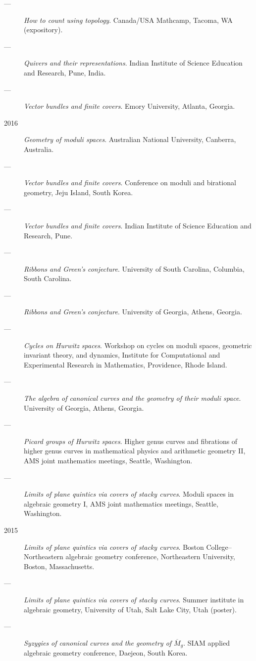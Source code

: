\documentclass[11pt]{article}
\begin{document}
\begin{description}
\item[{---}] \emph{How to count using topology}. Canada/USA Mathcamp, Tacoma, WA (expository).
\item[{---}] \emph{Quivers and their representations}. Indian Institute of Science Education and Research, Pune, India.
\item[{---}] \emph{Vector bundles and finite covers}. Emory University, Atlanta, Georgia.
\item[{2016}] \emph{Geometry of moduli spaces}. Australian National University, Canberra, Australia.
\item[{---}] \emph{Vector bundles and finite covers}. Conference on moduli and birational geometry, Jeju Island, South Korea.
\item[{---}] \emph{Vector bundles and finite covers}. Indian Institute of Science Education and Research, Pune.
\item[{---}] \emph{Ribbons and Green's conjecture}. University of South Carolina, Columbia, South Carolina.
\item[{---}] \emph{Ribbons and Green's conjecture}. University of Georgia, Athens, Georgia.
\item[{---}] \emph{Cycles on Hurwitz spaces}. Workshop on cycles on moduli spaces, geometric invariant theory, and dynamics, Institute for Computational and Experimental Research in Mathematics, Providence, Rhode Island.
\item[{---}] \emph{The algebra of canonical curves and the geometry of their moduli space}. University of Georgia, Athens, Georgia.
\item[{---}] \emph{Picard groups of Hurwitz spaces}. Higher genus curves and fibrations of higher genus curves in mathematical physics and arithmetic geometry II, AMS joint mathematics meetings, Seattle, Washington.
\item[{---}] \emph{Limits of plane quintics via covers of stacky curves}. Moduli spaces in algebraic geometry I, AMS joint mathematics meetings, Seattle, Washington.
\item[{2015}] \emph{Limits of plane quintics via covers of stacky curves}. Boston College--Northeastern algebraic geometry conference, Northeastern University, Boston, Massachusetts.
\item[{---}] \emph{Limits of plane quintics via covers of stacky curves}. Summer institute in algebraic geometry, University of Utah, Salt Lake City, Utah (poster).
\item[{---}] \emph{Syzygies of canonical curves and the geometry of \(\overline M_g\)}. SIAM applied algebraic geometry conference, Daejeon, South Korea.

\end{description}
\end{document}
